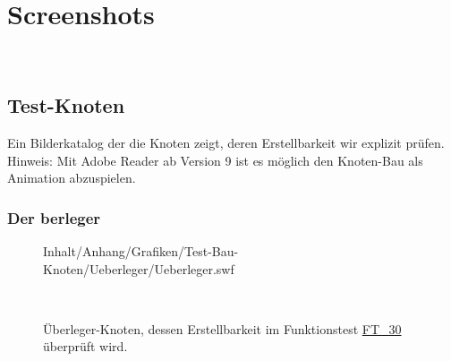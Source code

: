 %



\section{Screenshots}
\label{Anhang:Aufnahmen}


~\\



\newpage




\subsection{Test-Knoten}

Ein Bilderkatalog der die Knoten zeigt, deren Erstellbarkeit wir explizit prüfen. Hinweis: Mit Adobe Reader ab Version 9 ist es möglich den Knoten-Bau als Animation abzuspielen.\\

	\subsubsection*{Der berleger\grqq}
	
	
		\begin{figure}[!h]
		
			\label{Abb:Test-Bau-Knoten:Ueberleger}
			\centering	
			
			{Inhalt/Anhang/Grafiken/Test-Bau-Knoten/Ueberleger/Ueberleger.swf}
			
			~\\
	
			\caption{Überleger-Knoten, dessen Erstellbarkeit im Funktionstest \hyperref[FT:30:2]{FT\_30} überprüft wird. }
	
		\end{figure}
		
